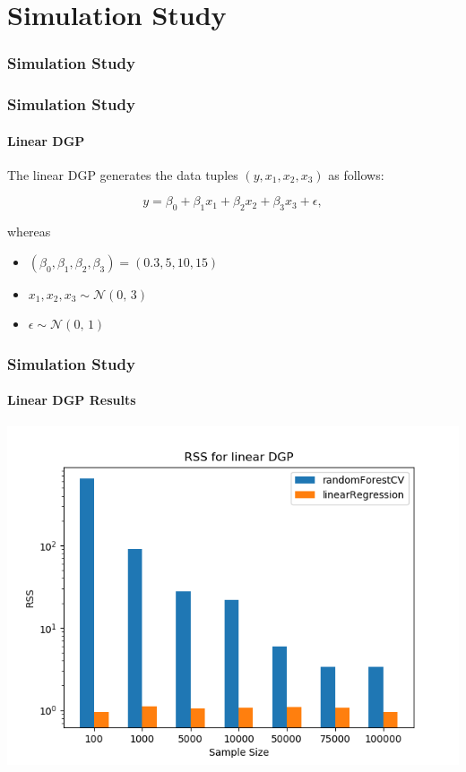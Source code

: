 

\section{Simulation Study}
\frame{\sectionpage}
\frametitle{Simulation Study}
\begin{frame}
    \frametitle{Simulation Study}
    \framesubtitle{Linear DGP}
    The linear DGP generates the data tuples \( (y, x_{1}, x_{2}, x_{3}) \) as follows:

    \begin{equation*}\label{eq:linear_dgp}
        y = \beta_{0} + \beta_{1} x_{1} + \beta_{2} x_{2} + \beta_{3} x_{3} + \epsilon,
    \end{equation*}
    
    whereas
    \begin{itemize}
        \item $ (\beta_{0}, \beta_{1}, \beta_{2}, \beta_{3} ) = (0.3, 5, 10, 15)$
        \item $x_{1}, x_{2}, x_{3} \sim \mathcal{N}(0,\,3)$
        \item $\epsilon \sim \mathcal{N}(0,\,1)$
    \end{itemize}
\end{frame}

\begin{frame}
    \frametitle{Simulation Study}
    \framesubtitle{Linear DGP Results}
	\begin{center}		
		\includegraphics[height=0.7\textheight]{images/forest_vs_ols_linearDGP.png}
	\end{center}
\end{frame}


